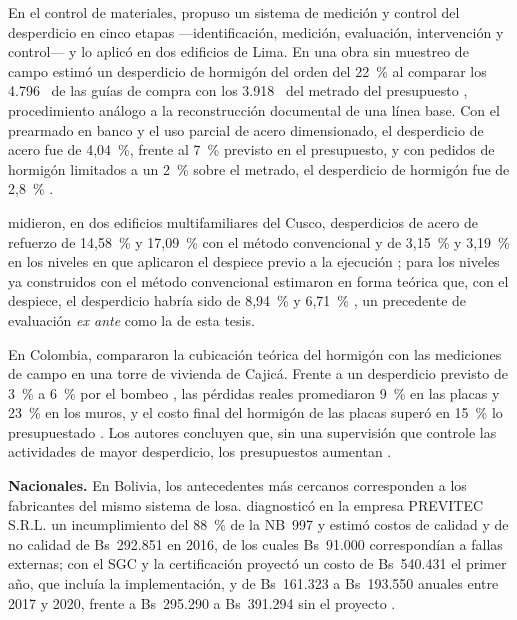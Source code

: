 En el control de materiales, \textcite{galarza2011} propuso un sistema de medición y control del desperdicio en cinco etapas ---identificación, medición, evaluación, intervención y control--- \parencite[pp.~39--40]{galarza2011} y lo aplicó en dos edificios de Lima. En una obra sin muestreo de campo estimó un desperdicio de hormigón del orden del 22~\% al comparar los 4.796~\mtres{} de las guías de compra con los 3.918~\mtres{} del metrado del presupuesto \parencite[p.~53]{galarza2011}, procedimiento análogo a la reconstrucción documental de una línea base. Con el prearmado en banco y el uso parcial de acero dimensionado, el desperdicio de acero fue de 4,04~\%, frente al 7~\% previsto en el presupuesto, y con pedidos de hormigón limitados a un 2~\% sobre el metrado, el desperdicio de hormigón fue de 2,8~\% \parencite[pp.~60, 73, 75]{galarza2011}.

\textcite{chino2024} midieron, en dos edificios multifamiliares del Cusco, desperdicios de acero de refuerzo de 14,58~\% y 17,09~\% con el método convencional y de 3,15~\% y 3,19~\% en los niveles en que aplicaron el despiece previo a la ejecución \parencite[pp.~147, 169]{chino2024}; para los niveles ya construidos con el método convencional estimaron en forma teórica que, con el despiece, el desperdicio habría sido de 8,94~\% y 6,71~\% \parencite[pp.~148, 192]{chino2024}, un precedente de evaluación \emph{ex ante} como la de esta tesis.

En Colombia, \textcite{rojas2018} compararon la cubicación teórica del hormigón con las mediciones de campo en una torre de vivienda de Cajicá. Frente a un desperdicio previsto de 3~\% a 6~\% por el bombeo \parencite[p.~33]{rojas2018}, las pérdidas reales promediaron 9~\% en las placas y 23~\% en los muros, y el costo final del hormigón de las placas superó en 15~\% lo presupuestado \parencite[pp.~63--64, 69]{rojas2018}. Los autores concluyen que, sin una supervisión que controle las actividades de mayor desperdicio, los presupuestos aumentan \parencite[p.~69]{rojas2018}.

\textbf{Nacionales.} En Bolivia, los antecedentes más cercanos corresponden a los fabricantes del mismo sistema de losa. \textcite{capcha2016} diagnosticó en la empresa PREVITEC S.R.L. un incumplimiento del 88~\% de la NB~997 \parencite[p.~132]{capcha2016} y estimó costos de calidad y de no calidad de Bs~292.851 en 2016, de los cuales Bs~91.000 correspondían a fallas externas; con el SGC y la certificación proyectó un costo de Bs~540.431 el primer año, que incluía la implementación, y de Bs~161.323 a Bs~193.550 anuales entre 2017 y 2020, frente a Bs~295.290 a Bs~391.294 sin el proyecto \parencite[p.~128]{capcha2016}.

